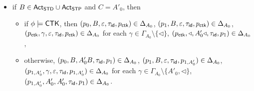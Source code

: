 \begin{itemize}
\begin{itemize}
\begin{itemize}
				\item if $B \in {\sf Act}_{\sf STD} \cup {\sf Act}_{\sf STP}$ and $C = A'_0$,  then 
				\begin{itemize}
					\item if $\phi \models \mathsf{CTK}$, then $(p_0, B, \varepsilon, \tau_{\mathsf{id}}, p_{\sf ctk}) \in \Delta_{A_0}$, $(p_1, B, \varepsilon, \tau_{\mathsf{id}}, p_{\sf ctk}) \in \Delta_{A_0}$, $(p_{\sf ctk}, \gamma, \varepsilon, \tau_{\mathsf{id}}, p_{\sf ctk}) \in \Delta_{A_0}$ for each $\gamma \in \Gamma_{A_0} \setminus \{\triangleleft\}$, $(p_{\sf ctk}, \triangleleft, A'_0 \triangleleft, \tau_{\mathsf{id}}, p_1) \in \Delta_{A_0}$, 
					\item otherwise, $(p_0, B, A'_0 B, \tau_{\mathsf{id}}, p_1) \in \Delta_{A_0}$, $(p_1, B, \varepsilon, \tau_{\mathsf{id}}, p_{1, A'_0}) \in \Delta_{A_0}$, $(p_{1, A'_0}, \gamma, \varepsilon, \tau_{\mathsf{id}}, p_{1, A'_0}) \in \Delta_{A_0}$ for each $\gamma \in \Gamma_{A_0} \setminus \{A'_0, \triangleleft\}$,  $(p_{1, A'_0}, A'_0, A'_0, \tau_{\mathsf{id}}, p_1) \in \Delta_{A_0}$.  
				\end{itemize}				
            \end{itemize}
        \end{itemize}
\end{itemize}

